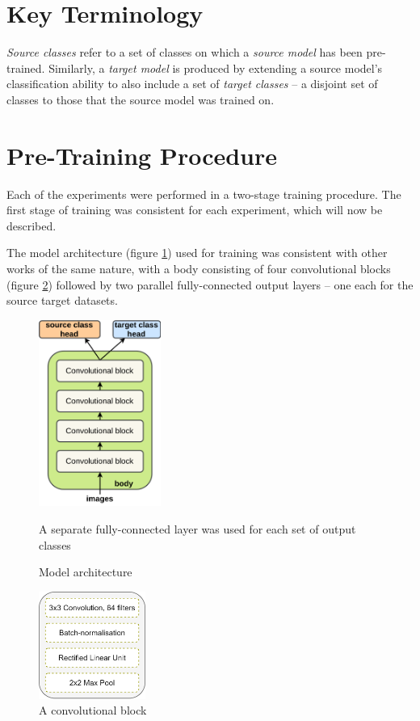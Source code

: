 \documentclass{report}
\begin{document}
	\section{Key Terminology}
	\textit{Source classes} refer to a set of classes on which a \textit{source model} has been pre-trained. Similarly, a \textit{target model} is produced by extending a source model's classification ability to also include a set of \textit{target classes} -- a disjoint set of classes to those that the source model was trained on. \par
	
	\section{Pre-Training Procedure}
	Each of the experiments were performed in a two-stage training procedure. The first stage of training was consistent for each experiment, which will now be described. \par
	The model architecture (figure \ref{fig:model:1}) used for training was consistent with other works of the same nature, with a body consisting of four convolutional blocks (figure \ref{fig:convblock:1}) followed by two parallel fully-connected output layers -- one each for the source target datasets. \par
	\begin{figure}[h]
		\centering
		\includegraphics[width=4cm]{modelarchitecture}
		\caption{Model architecture}
		\label{fig:model:1}
		A separate fully-connected layer was used for each set of output classes
	\end{figure}
	\begin{figure}[h]
		\centering
		\includegraphics[width=3.5cm]{convblock}
		\caption{A convolutional block}
		\label{fig:convblock:1}
	\end{figure}
\end{document}
